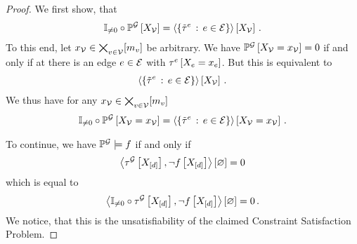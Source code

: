 \begin{proof}
    We first show, that
    \begin{align*}
        \nonzerocirc\probofat{\graph}{\nodevariables} =
        \contractionof{\{\sechypercoreof{\edge} \wcols \edge\in\edges \}}{\nodevariables} \, . %
    \end{align*}
    To this end, let $x_{\mathcal{V}}\in\bigtimes_{v\in\mathcal{V}}[m_{v}]$ be arbitrary.
    We have $\mathbb{P}^{\mathcal{G}}\left[X_{\mathcal{V}}=x_{\mathcal{V}}\right]=0$ if and only if at there is an edge $e\in\mathcal{E}$ with $\tau^{e}\left[X_{e}=x_{e}\right]$.
    But this is equivalent to
    \begin{align*}
        \left\langle \{\tilde{\tau}^{e} \,:\, e\in\mathcal{E} \}\right\rangle \left[ X_{\mathcal{V}} \right] \, .
    \end{align*}
    We thus have for any $x_{\mathcal{V}}\in\bigtimes_{v\in\mathcal{V}}[m_{v}]$
    \begin{align*}
        \nonzerocirc\probofat{\graph}{\indexednodevariables} =
        \contractionof{\{\sechypercoreof{\edge} \wcols \edge\in\edges \}}{\indexednodevariables} \, . %
    \end{align*}

    To continue, we have $\mathbb{P}^{\mathcal{G}}\models f$ if and only if
    \begin{align*}
        \left\langle \tau^{\mathcal{G}}\left[X_{[d]}\right],\lnot f\left[X_{[d]}\right]\right\rangle \left[ \varnothing \right] = 0
    \end{align*}
    which is equal to
    \begin{align*}
        \left\langle \mathbb{I}_{\neq0}\circ\tau^{\mathcal{G}}\left[X_{[d]}\right],\lnot f\left[X_{[d]}\right]\right\rangle \left[ \varnothing \right] = 0 \, .
    \end{align*}
    We notice, that this is the unsatisfiability of the claimed Constraint Satisfaction Problem.

\end{proof}

